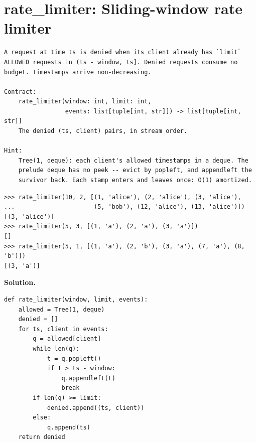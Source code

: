 \documentclass[10pt,letterpaper]{book}
\begin{document}
\section{rate\_limiter: Sliding-window rate limiter}
\begin{lstlisting}[style=ex]
A request at time ts is denied when its client already has `limit`
ALLOWED requests in (ts - window, ts]. Denied requests consume no
budget. Timestamps arrive non-decreasing.

Contract:
    rate_limiter(window: int, limit: int,
                 events: list[tuple[int, str]]) -> list[tuple[int, str]]
    The denied (ts, client) pairs, in stream order.

Hint:
    Tree(1, deque): each client's allowed timestamps in a deque. The
    prelude deque has no peek -- evict by popleft, and appendleft the
    survivor back. Each stamp enters and leaves once: O(1) amortized.
\end{lstlisting}
\begin{lstlisting}[style=ex]
>>> rate_limiter(10, 2, [(1, 'alice'), (2, 'alice'), (3, 'alice'),
...                      (5, 'bob'), (12, 'alice'), (13, 'alice')])
[(3, 'alice')]
>>> rate_limiter(5, 3, [(1, 'a'), (2, 'a'), (3, 'a')])
[]
>>> rate_limiter(5, 1, [(1, 'a'), (2, 'b'), (3, 'a'), (7, 'a'), (8, 'b')])
[(3, 'a')]
\end{lstlisting}
\noindent\textbf{Solution.}
\begin{lstlisting}[style=code]
def rate_limiter(window, limit, events):
    allowed = Tree(1, deque)
    denied = []
    for ts, client in events:
        q = allowed[client]
        while len(q):
            t = q.popleft()
            if t > ts - window:
                q.appendleft(t)
                break
        if len(q) >= limit:
            denied.append((ts, client))
        else:
            q.append(ts)
    return denied
\end{lstlisting}
\end{document}
